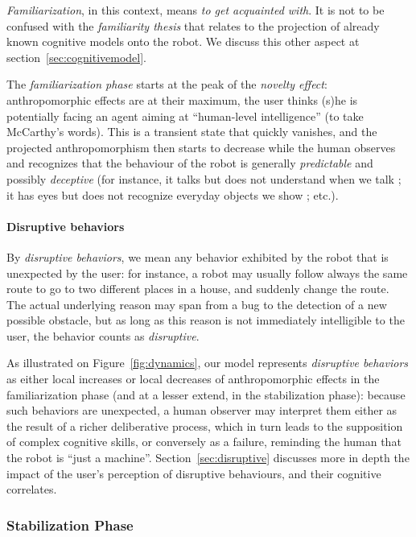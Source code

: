 \documentclass{frontiersSCNS} %
\begin{document}
\emph{Familiarization}, in this context, means \emph{to get acquainted with}.
It is not to be confused with the \emph{familiarity thesis} that relates to the
projection of already known cognitive models onto the robot. We discuss this other
aspect at section~\ref{sec:cognitivemodel}.

The \emph{familiarization phase} starts at the peak of the \emph{novelty
effect}: anthropomorphic effects are at their maximum, the user thinks (s)he is
potentially facing an agent aiming at ``human-level intelligence'' (to take
McCarthy's words). This is a transient state that quickly vanishes, and the
projected anthropomorphism then starts to decrease while the human observes and
recognizes that the behaviour of the robot is generally \emph{predictable} and
possibly \emph{deceptive} (for instance, it talks but does not understand when
we talk ; it has eyes but does not recognize everyday objects we show ; etc.).

\paragraph{Disruptive behaviors}

By \emph{disruptive behaviors}, we mean any behavior exhibited by the robot that
is unexpected by the user: for instance, a robot may usually follow always the
same route to go to two different places in a house, and suddenly change the
route. The actual underlying reason may span from a bug to the detection of a
new possible obstacle, but as long as this reason is not immediately
intelligible to the user, the behavior counts as \emph{disruptive}.

As illustrated on Figure~\ref{fig:dynamics}, our model represents
\emph{disruptive behaviors} as either local increases or local decreases of
anthropomorphic effects in the familiarization phase (and at a lesser extend, in
the stabilization phase): because such behaviors are unexpected, a human
observer may interpret them either as the result of a richer deliberative
process, which in turn leads to the supposition of complex cognitive skills, or
conversely as a failure, reminding the human that the robot is ``just a
machine''. Section~\ref{sec:disruptive} discusses more in depth the impact of
the user's perception of disruptive behaviours, and their cognitive correlates.

\subsubsection{Stabilization Phase}
\label{sec:stabilization}
\end{document}
